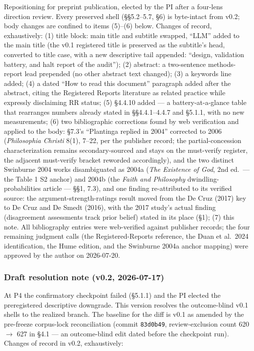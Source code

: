 Repositioning for preprint publication, elected by the PI after a four-lens direction review. Every preserved shell (\S{}\S{}5.2--5.7, \S{}6) is byte-intact from v0.2; body changes are confined to items (5)--(6) below. Changes of record, exhaustively: (1) title block: main title and subtitle swapped, ``LLM'' added to the main title (the v0.1 registered title is preserved as the subtitle's head, converted to title case, with a new descriptive tail appended: ``design, validation battery, and halt report of the audit''); (2) abstract: a two-sentence methods-report lead prepended (no other abstract text changed); (3) a keywords line added; (4) a dated ``How to read this document'' paragraph added after the abstract, citing the Registered Reports literature as related practice while expressly disclaiming RR status; (5) \S{}4.4.10 added --- a battery-at-a-glance table that rearranges numbers already stated in \S{}\S{}4.4.1--4.4.7 and \S{}5.1.1, with no new measurements; (6) two bibliographic corrections found by web verification and applied to the body: \S{}7.3's ``Plantinga replied in 2004'' corrected to 2006 (\emph{Philosophia Christi} 8(1), 7--22, per the publisher record; the partial-concession characterization remains secondary-sourced and stays on the must-verify register, the adjacent must-verify bracket reworded accordingly), and the two distinct Swinburne 2004 works disambiguated as 2004a (\emph{The Existence of God}, 2nd ed.~--- the Table 1 S2 anchor) and 2004b (the \emph{Faith and Philosophy} dwindling-probabilities article --- \S{}\S{}1, 7.3), and one finding re-attributed to its verified source: the argument-strength-ratings result moved from the De Cruz (2017) key to De Cruz and De Smedt (2016), with the 2017 study's actual finding (disagreement assessments track prior belief) stated in its place (\S{}1); (7) this note. All bibliography entries were web-verified against publisher records; the four remaining judgment calls (the Registered-Reports reference, the Duan et al.~2024 identification, the Hume edition, and the Swinburne 2004a anchor mapping) were approved by the author on 2026-07-20.

\subsubsection{Draft resolution note (v0.2, 2026-07-17)}\label{draft-resolution-note-v0.2-2026-07-17}

At P4 the confirmatory checkpoint failed (\S{}5.1.1) and the PI elected the preregistered descriptive downgrade. This version resolves the outcome-blind v0.1 shells to the realized branch. The baseline for the diff is v0.1 as amended by the pre-freeze corpus-lock reconciliation (commit \texttt{83d0b49}, review-exclusion count 620 $\to$ 627 in \S{}4.1 --- an outcome-blind edit dated before the checkpoint run). Changes of record in v0.2, exhaustively:

